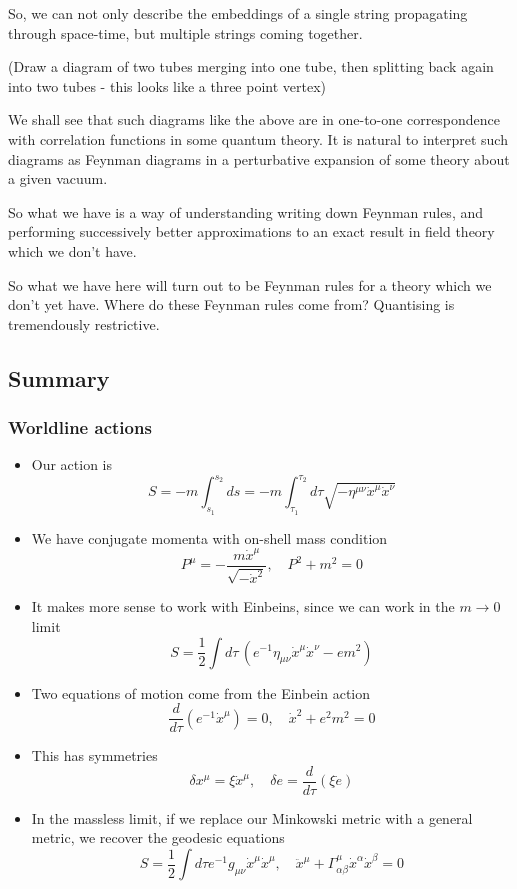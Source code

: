 \documentclass[11pt, oneside]{article}   	%
\theoremstyle{slanted}
\begin{document}
So, we can not only describe the embeddings 
of a single string propagating through space-time, 
but multiple strings coming together. 

(Draw a diagram of two tubes merging into one tube, 
then splitting back again into two tubes - this looks like 
a three point vertex)

We shall see that such diagrams like the above 
are in one-to-one 
correspondence with correlation functions in some 
quantum theory. 
It is natural to interpret such diagrams 
as Feynman diagrams in a perturbative expansion 
of some theory about a given vacuum. 

So what we have is a way of understanding 
writing down Feynman rules, and performing 
successively better approximations to 
an exact result in field theory which we don't have. 

So what we have here will turn out to be Feynman rules for a theory 
which we don't yet have. Where do these Feynman rules come from? 
Quantising is tremendously restrictive. 

\subsection*{Summary}
 
\subsubsection*{Worldline actions}
\begin{itemize}[leftmargin=*]
	\item Our action is 
		\[
			S =  - m \int_{ s_1 } ^{ s_2 } ds 
			 = - m \int_{ \tau_1 } ^{ \tau_2 } d \tau \sqrt{ -
			 \eta ^{ \mu \nu } \dot{ x } ^ \mu \dot{ x } ^ \nu   } 
		\] 
	\item We have conjugate momenta with on-shell mass condition  
		\[
		 P^ \mu = -  \frac{m \dot{ x } ^ \mu  }{\sqrt{  - \dot{ x } ^ 2  }  }, 
		 \quad  P ^ 2 + m ^ 2 = 0 
		\]  
	\item It makes more sense to work with Einbeins,
		since we can work in the $ m \to 0 $ limit 
	\[
		S  = \frac{1}{2 } \int d\tau\, \left( e^{ - 1} 
		\eta _{ \mu \nu } \dot{ x } ^ \mu \dot{ x } ^ \nu   - e m ^ 2   \right)  
	\] 
\item Two equations of motion come from the Einbein action 
	\[
		\frac{d }{ d \tau } \left( e ^{ - 1} \dot{ x } ^ \mu   \right)   = 0 , \quad 
		\dot{ x } ^ 2 + e ^ 2 m ^ 2 = 0  
	\]
\item This has symmetries 
	\[
	 \delta x ^ \mu  = \xi \dot{ x } ^ \mu , \quad \delta e  = \frac{ d }{ d \tau } 
	 \left( \xi \dot{ e }   \right) 
	\]
\item In the massless limit, if we replace our Minkowski metric 
	with a general metric, we recover the geodesic equations 
	\[
	 S  = \frac{1}{2 } \int d \tau  e^{ - 1} g_{ \mu \nu } \dot{ x } ^ \mu \dot{  x } ^ \mu , 
	 \quad \ddot{x } ^ \mu + \Gamma ^ \mu _{ \alpha \beta }  \dot{ x } ^ \alpha 
	 \dot{ x } ^ \beta  = 0 
	\]  
\end{itemize}
\end{document}
